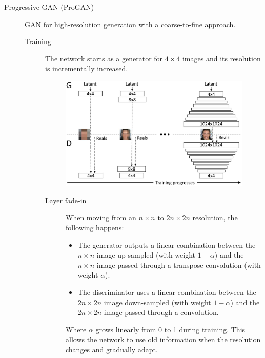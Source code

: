 \begin{description}
    \item[Progressive GAN (ProGAN)] 
        GAN for high-resolution generation with a coarse-to-fine approach. 
        
        \begin{description}
            \item[Training] 
                The network starts as a generator for $4 \times 4$ images and its resolution is incrementally increased.

                \begin{figure}[H]
                    \centering
                    \includegraphics[width=0.65\linewidth]{./img/_progan.jpg}
                \end{figure}

                \begin{description}
                    \item[Layer fade-in] 
                        When moving from an $n \times n$ to $2n \times 2n$ resolution, the following happens:
                        \begin{itemize}
                            \item The generator outputs a linear combination between the $n \times n$ image up-sampled (with weight $1-\alpha$) and the $n \times n$ image passed through a transpose convolution (with weight $\alpha$).
                            \item The discriminator uses a linear combination between the $2n \times 2n$ image down-sampled (with weight $1-\alpha$) and the $2n \times 2n$ image passed through a convolution.
                        \end{itemize}
                        Where $\alpha$ grows linearly from 0 to 1 during training. This allows the network to use old information when the resolution changes and gradually adapt.


\end{description}
\end{description}
\end{description}

